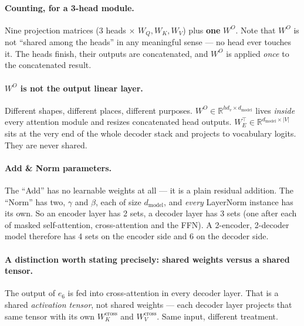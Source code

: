 \documentclass[11pt,a4paper]{article}
\begin{document}
\paragraph{Counting, for a 3-head module.} Nine projection matrices ($3$ heads $\times$
$W_Q, W_K, W_V$) plus \textbf{one} $W^O$. Note that $W^O$ is not ``shared among the heads'' in
any meaningful sense --- no head ever touches it. The heads finish, their outputs are
concatenated, and $W^O$ is applied \emph{once} to the concatenated result.

\paragraph{$W^O$ is not the output linear layer.} Different shapes, different places,
different purposes. $W^O \in \mathbb{R}^{h d_v \times d_{\text{model}}}$ lives \emph{inside}
every attention module and resizes concatenated head outputs. $W_E^\top \in \mathbb{R}^{
d_{\text{model}} \times |V|}$ sits at the very end of the whole decoder stack and projects to
vocabulary logits. They are never shared.

\paragraph{Add \& Norm parameters.} The ``Add'' has no learnable weights at all --- it is a
plain residual addition. The ``Norm'' has two, $\gamma$ and $\beta$, each of size
$d_{\text{model}}$, and \emph{every} LayerNorm instance has its own. So an encoder layer has
2 sets, a decoder layer has 3 sets (one after each of masked self-attention, cross-attention
and the FFN). A 2-encoder, 2-decoder model therefore has 4 sets on the encoder side and 6 on
the decoder side.

\paragraph{A distinction worth stating precisely: shared weights versus a shared tensor.} The
output of $e_6$ is fed into cross-attention in every decoder layer. That is a shared
\emph{activation tensor}, not shared weights --- each decoder layer projects that same tensor
with its own $W_K^{\text{cross}}$ and $W_V^{\text{cross}}$. Same input, different treatment.
\end{document}
